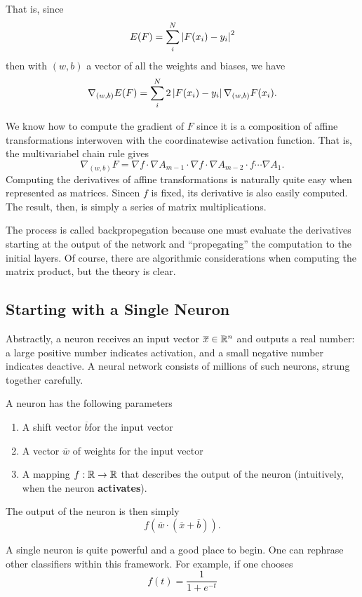 \documentclass[12pt,letterpaper,boxed]{article}
\begin{document}
		That is, since
		\[
			E(F) = \sum_i^N \left| F(x_i) - y_i \right|^2
		\]
		then with $(w,b)$ a vector of all the weights and biases, we have
		\[
			\nabla_{(w, b)} E(F) = \sum_i^N 2 \left| F(x_i) - y_i \right| \nabla_{(w, b)} F(x_i).
		\]

		We know how to compute the gradient of $F$ since it is a composition of affine transformations interwoven with the coordinatewise activation function. That is, the multivariabel chain rule gives
		\[
			\nabla_{(w, b)} F = \nabla f \cdot \nabla A_{m - 1} \cdot \nabla f \cdot \nabla A_{m - 2} \cdot f \cdots \nabla A_1. 
		\]
		Computing the derivatives of affine transformations is naturally quite easy when represented as matrices. Sincen $f$ is fixed, its derivative is also easily computed. The result, then, is simply a series of matrix multiplications.

		The process is called backpropegation because one must evaluate the derivatives starting at the output of the network and ``propegating'' the computation to the initial layers. Of course, there are algorithmic considerations when computing the matrix product, but the theory is clear.

	\subsection{Starting with a Single Neuron}
		Abstractly, a neuron receives an input vector $\overline{x} \in {\mathbb{R}}^n$ and outputs a real number: a large positive number indicates activation, and a small negative number indicates deactive. A neural network consists of millions of such neurons, strung together carefully. 


		A neuron has the following parameters

		\begin{enumerate}
			\item A shift vector $\overline{b}$for the input vector
			\item A vector $\overline{w}$ of weights for the input vector
			\item A mapping $f : {\mathbb{R}} \to {\mathbb{R}}$ that describes the output of the neuron (intuitively, when the neuron \textbf{activates}).
		\end{enumerate}

		The output of the neuron is then simply
		\[
			f(\overline{w} \cdot (\overline{x} + \overline{b})).
		\]

		A single neuron is quite powerful and a good place to begin. One can rephrase other classifiers \cite{andrej2017} within this framework. For example, if one chooses
		\[
			f(t) = \frac{1}{1 + e^{-t}}
		\]
\end{document}
